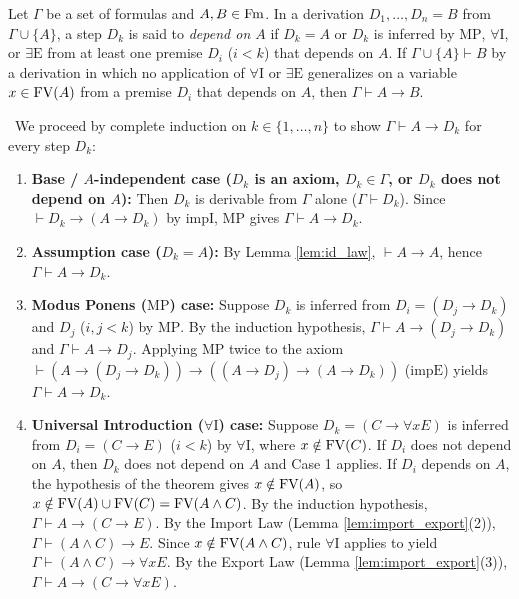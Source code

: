 \documentclass[10pt,a4paper]{article}
\begin{document}
\begin{theorem}\label{thm:deduction}
Let $\Gamma$ be a set of formulas and $A, B \in {\textrm{Fm}}$. In a derivation $D_1, \dots, D_n = B$ from $\Gamma \cup \{A\}$, a step $D_k$ is said to \emph{depend on $A$} if $D_k = A$ or $D_k$ is inferred by $\textrm{MP}$, $\forall\textrm{I}$, or $\exists\textrm{E}$ from at least one premise $D_i$ ($i < k$) that depends on $A$. If $\Gamma \cup \{A\} \vdash B$ by a derivation in which no application of $\forall\textrm{I}$ or $\exists\textrm{E}$ generalizes on a variable $x \in {\textrm{FV}}(A)$ from a premise $D_i$ that depends on $A$, then $\Gamma \vdash A \to B$.
\end{theorem}
\myprf\ We proceed by complete induction on $k \in \{1, \dots, n\}$ to show $\Gamma \vdash A \to D_k$ for every step $D_k$:
\begin{enumerate}
\item \textbf{Base / $A$-independent case ($D_k$ is an axiom, $D_k \in \Gamma$, or $D_k$ does not depend on $A$):} Then $D_k$ is derivable from $\Gamma$ alone ($\Gamma \vdash D_k$). Since $\vdash D_k \to (A \to D_k)$ by $\textrm{impI}$, $\textrm{MP}$ gives $\Gamma \vdash A \to D_k$.
\item \textbf{Assumption case ($D_k = A$):} By Lemma \ref{lem:id_law}, $\vdash A \to A$, hence $\Gamma \vdash A \to D_k$.
\item \textbf{Modus Ponens ($\textrm{MP}$) case:} Suppose $D_k$ is inferred from $D_i = (D_j \to D_k)$ and $D_j$ ($i, j < k$) by $\textrm{MP}$. By the induction hypothesis, $\Gamma \vdash A \to (D_j \to D_k)$ and $\Gamma \vdash A \to D_j$. Applying $\textrm{MP}$ twice to the axiom $\vdash (A \to (D_j \to D_k)) \to ((A \to D_j) \to (A \to D_k))$ ($\textrm{impE}$) yields $\Gamma \vdash A \to D_k$.
\item \textbf{Universal Introduction ($\forall\textrm{I}$) case:} Suppose $D_k = (C \to \forall x E)$ is inferred from $D_i = (C \to E)$ ($i < k$) by $\forall\textrm{I}$, where $x \notin {\textrm{FV}}(C)$. If $D_i$ does not depend on $A$, then $D_k$ does not depend on $A$ and Case 1 applies. If $D_i$ depends on $A$, the hypothesis of the theorem gives $x \notin {\textrm{FV}}(A)$, so $x \notin {\textrm{FV}}(A) \cup {\textrm{FV}}(C) = {\textrm{FV}}(A \land C)$. By the induction hypothesis, $\Gamma \vdash A \to (C \to E)$. By the Import Law (Lemma \ref{lem:import_export}(2)), $\Gamma \vdash (A \land C) \to E$. Since $x \notin {\textrm{FV}}(A \land C)$, rule $\forall\textrm{I}$ applies to yield $\Gamma \vdash (A \land C) \to \forall x E$. By the Export Law (Lemma \ref{lem:import_export}(3)), $\Gamma \vdash A \to (C \to \forall x E)$.

\end{enumerate}
\end{document}
